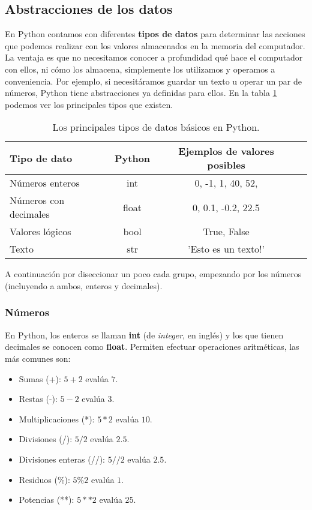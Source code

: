 \subsection{Abstracciones de los datos}

En Python contamos con diferentes \textbf{tipos de datos} para determinar las acciones que podemos realizar con los valores almacenados en la memoria del computador. La ventaja es que no  necesitamos conocer a profundidad qué hace el computador con ellos, ni cómo los almacena, simplemente los utilizamos y operamos a conveniencia. Por ejemplo, si necesitáramos guardar un texto u operar un par de números, Python tiene abstracciones ya definidas para ellos. En la tabla \ref{tabla_tipos} podemos ver los principales tipos que existen.

\begin{table}[ht]
\centering
\begin{tabular}{ l c c c }
	
	\hline
	Tipo de dato & Python & Ejemplos de valores posibles \\
	\hline
	Números enteros & int  & 0, -1, 1, 40, 52,  \\ 
	Números con decimales & float & 0, 0.1, -0.2, 22.5 \\ 
	Valores lógicos & bool & True, False \\
	Texto & str & 'Esto es un texto!' \\
	\hline
	
\end{tabular}
\caption{Los principales tipos de datos básicos en Python.}
\label{tabla_tipos}
\end{table}

A continuación por diseccionar un poco cada grupo, empezando por los números (incluyendo a ambos, enteros y decimales).

\subsubsection{Números}

En Python, los enteros se llaman \textbf{int} (de \emph{integer}, en inglés) y los que tienen decimales se conocen como \textbf{float}. Permiten efectuar operaciones aritméticas, las más comunes son:

\begin{itemize}
\item Sumas (+): $5 + 2$ evalúa $7$.
\item Restas (-): $5 - 2$ evalúa $3$.
\item Multiplicaciones (*): $5 * 2$ evalúa $10$.
\item Divisiones (/): $5 / 2$ evalúa $2.5$.
\item Divisiones enteras (//): $5 // 2$ evalúa $2.5$.
\item Residuos (\%): $5 \% 2$ evalúa $1$.
\item Potencias (**): $5 ** 2$ evalúa $25$.
\end{itemize}

